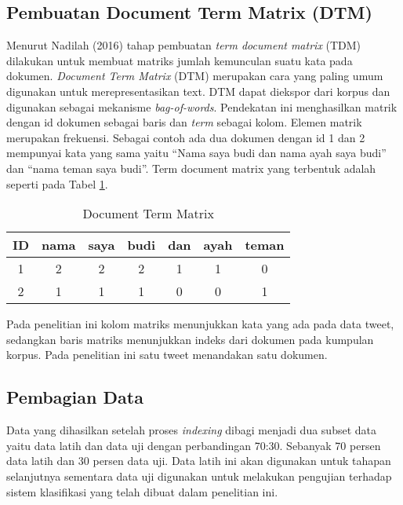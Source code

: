 \subsection*{Pembuatan Document Term Matrix (DTM)}

Menurut Nadilah (2016) tahap pembuatan \textit{term document matrix} (TDM) dilakukan untuk membuat matriks jumlah kemunculan suatu kata pada dokumen. \textit{Document Term Matrix} (DTM) merupakan cara yang paling umum digunakan untuk merepresentasikan text. DTM dapat diekspor dari korpus dan digunakan sebagai mekanisme \textit{bag-of-words}. Pendekatan ini menghasilkan matrik dengan id dokumen sebagai baris dan \textit{term} sebagai kolom. Elemen matrik merupakan frekuensi.
Sebagai contoh ada dua dokumen dengan id 1 dan 2 mempunyai kata yang sama yaitu “Nama saya budi dan nama ayah saya budi” dan “nama teman saya budi”. Term document matrix yang terbentuk adalah seperti pada Tabel \ref{tab:dtm}.

\begin{table}[hbt]
	\caption{Document Term Matrix}
	\centering
	\begin{adjustbox}{max width=\textwidth}
		\begin{tabular}{*{7}{c}}%
			\toprule
			ID & nama & saya & budi & dan & ayah & teman \\
			\midrule
			1 & 2 & 2 & 2 & 1 & 1 & 0 \\
			2 & 1 & 1 & 1 & 0 & 0 & 1 \\
			\bottomrule
		\end{tabular}
	\end{adjustbox}
	\label{tab:dtm}
\end{table}

Pada penelitian ini kolom matriks menunjukkan kata yang ada pada data tweet, sedangkan baris matriks menunjukkan indeks dari dokumen pada kumpulan korpus. Pada penelitian ini satu tweet menandakan satu dokumen.

\subsection*{Pembagian Data}

Data yang dihasilkan setelah proses \textit{indexing} dibagi  menjadi  dua subset data yaitu data latih dan data uji dengan perbandingan 70:30. Sebanyak 70 persen data latih dan 30 persen data uji. Data latih ini akan digunakan untuk tahapan selanjutnya sementara data uji digunakan untuk melakukan pengujian terhadap sistem klasifikasi yang telah dibuat dalam penelitian ini.

